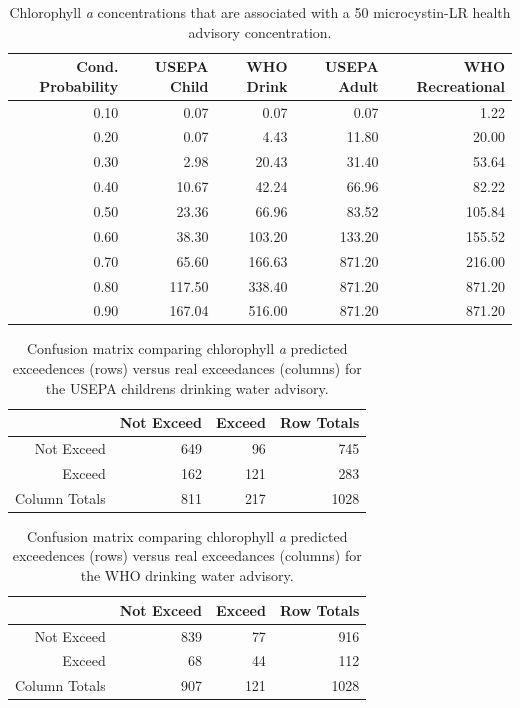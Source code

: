 \documentclass[10pt,a4paper,twocolumn]{article}
\begin{document}
\begin{table}[ht]
\caption{Chlorophyll \textit{a} concentrations that are 
                     associated with a 50%
                     microcystin-LR health advisory concentration.} 
\label{tab:mc_chla_table}
\begin{tabular}{rrrrr}
  \hline
Cond. Probability & USEPA Child & WHO Drink & USEPA Adult & WHO Recreational \\ 
  \hline
0.10 & 0.07 & 0.07 & 0.07 & 1.22 \\ 
  0.20 & 0.07 & 4.43 & 11.80 & 20.00 \\ 
  0.30 & 2.98 & 20.43 & 31.40 & 53.64 \\ 
  0.40 & 10.67 & 42.24 & 66.96 & 82.22 \\ 
  0.50 & 23.36 & 66.96 & 83.52 & 105.84 \\ 
  0.60 & 38.30 & 103.20 & 133.20 & 155.52 \\ 
  0.70 & 65.60 & 166.63 & 871.20 & 216.00 \\ 
  0.80 & 117.50 & 338.40 & 871.20 & 871.20 \\ 
  0.90 & 167.04 & 516.00 & 871.20 & 871.20 \\ 
   \hline
\end{tabular}
\end{table}

\begin{table}[ht]
\caption{Confusion matrix comparing chlorophyll \textit{a} 
                     predicted exceedences (rows) versus real exceedances 
                     (columns) for the USEPA childrens drinking water advisory.} 
\label{tab:child_conmat_table}
\begin{tabular}{rrrr}
  \hline
 & Not Exceed & Exceed & Row Totals \\ 
  \hline
Not Exceed & 649 &  96 & 745 \\ 
  Exceed & 162 & 121 & 283 \\ 
  Column Totals & 811 & 217 & 1028 \\ 
   \hline
\end{tabular}
\end{table}

\begin{table}[ht]
\caption{Confusion matrix comparing chlorophyll \textit{a} 
                     predicted exceedences (rows) versus real exceedances 
                     (columns) for the WHO drinking water advisory.} 
\label{tab:who_drink_conmat_table}
\begin{tabular}{rrrr}
  \hline
 & Not Exceed & Exceed & Row Totals \\ 
  \hline
Not Exceed & 839 &  77 & 916 \\ 
  Exceed &  68 &  44 & 112 \\ 
  Column Totals & 907 & 121 & 1028 \\ 
   \hline
\end{tabular}
\end{table}
\end{document}
